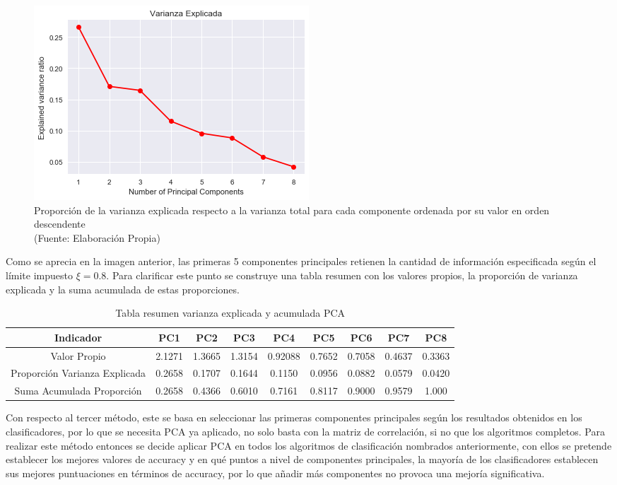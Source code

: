 \begin{figure}[ht!]
\centering
\includegraphics[width=.6\textwidth]{figures/varianza_ratio.png}
\caption[Proporción de la varianza explicada PCA]{Proporción de la varianza explicada respecto a la varianza total para cada componente ordenada por su valor en orden descendente  \\
{\scriptsize (Fuente: Elaboración Propia)}}
\label{fig:varianza_ratio}
\end{figure}

Como se aprecia en la imagen anterior, las primeras 5 componentes principales retienen la cantidad de información especificada según el límite impuesto $\xi =0.8$. Para clarificar este punto se construye una tabla resumen con los valores propios, la proporción de varianza explicada y la suma acumulada de estas proporciones.

\begin{table}[]
\centering
\caption[Tabla resumen varianza explicada y acumulada PCA]{Tabla resumen varianza explicada y acumulada PCA}
\label{my-label}
\begin{tabular}{|c|c|c|c|c|c|c|c|c|}
\hline
Indicador                     & PC1    & PC2    & PC3    & PC4     & PC5    & PC6    & PC7    & PC8    \\ \hline
Valor Propio                  & 2.1271 & 1.3665 & 1.3154 & 0.92088 & 0.7652 & 0.7058 & 0.4637 & 0.3363 \\ \hline
Proporción Varianza Explicada & 0.2658 & 0.1707 & 0.1644 & 0.1150  & 0.0956 & 0.0882 & 0.0579 & 0.0420 \\ \hline
Suma Acumulada Proporción     & 0.2658 & 0.4366 & 0.6010 & 0.7161  & 0.8117 & 0.9000 & 0.9579 & 1.000  \\ \hline
\end{tabular}
\end{table}

Con respecto al tercer método, este se basa en seleccionar las primeras componentes principales según los resultados obtenidos en los clasificadores, por lo que se necesita PCA ya aplicado, no solo basta con la matriz de correlación, si no que los algoritmos completos. Para realizar este método entonces se decide aplicar PCA en todos los algoritmos de clasificación nombrados anteriormente, con ellos se pretende establecer los mejores valores de accuracy y en qué puntos a nivel de componentes principales, la mayoría de los clasificadores establecen sus mejores puntuaciones en términos de accuracy, por lo que añadir más componentes no provoca una mejoría significativa.

